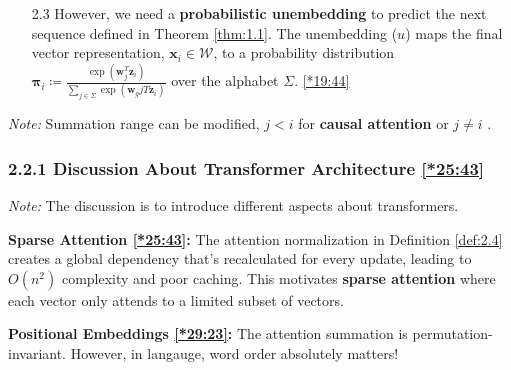 \documentclass[12pt, twoside]{article}
\begin{document}
\begin{definition}
\begin{enumerate}
\begin{enumerate}
\item[{2.3}] However, we need a \textbf{probabilistic unembedding} to predict the next sequence defined in Theorem \ref{thm:1.1}. The unembedding ($u$) maps the final vector representation, $\mathbf{x}_i \in \mathcal{W}$, to a probability distribution $\mathbf{\pi}_i \coloneqq\frac{\exp(\mathbf{w}_{j}^T \mathbf{z}_i)}{\sum_{j \in \Sigma} \exp(\mathbf{w}_{g}jT \mathbf{z}_i)}$ over the alphabet $\Sigma$. \href{https://youtu.be/1u6h3Nm3NvM?si=le_Dg2Rl3Kr4Mv3s&t=1184}{[*19:44]}

    \end{enumerate}
\end{enumerate}
\textit{Note:} Summation range can be modified, $j < i$ for \textbf{causal attention} or $j \neq i$ .
\end{definition}

\subsubsection*{2.2.1 Discussion About Transformer Architecture \href{https://youtu.be/1u6h3Nm3NvM?si=cJQ1smjRAK88W2C7&t=1543}{[*25:43]}}

\textit{Note:} The discussion is to introduce different aspects about transformers.

\textbf{Sparse Attention \href{https://youtu.be/1u6h3Nm3NvM?si=cJQ1smjRAK88W2C7&t=1543}{[*25:43]}:} The attention normalization in Definition \ref{def:2.4} creates a global dependency that's recalculated for every update, leading to $O(n^2)$ complexity and poor caching. This motivates \textbf{sparse attention} where each vector only attends to a limited subset of vectors.

\textbf{Positional Embeddings \href{https://youtu.be/1u6h3Nm3NvM?si=MPObGmLgx7i59976&t=1763}{[*29:23]}:} The attention summation is permutation-invariant. However, in langauge, word order absolutely matters!
\end{document}
